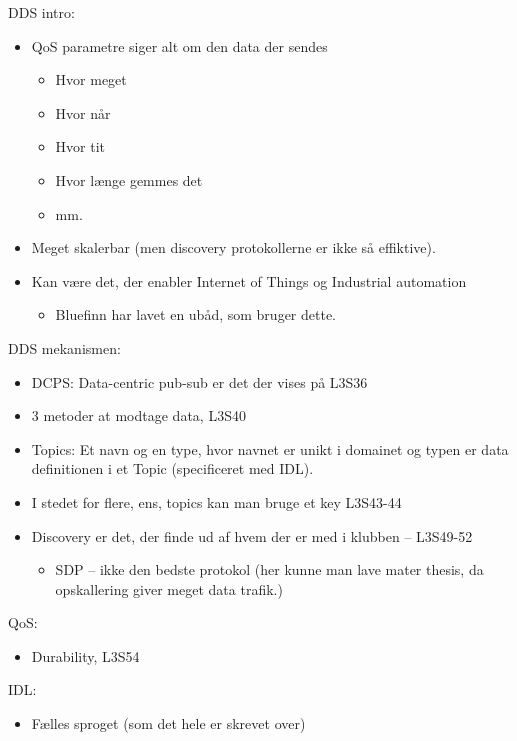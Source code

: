 \documentclass[oneside, 10pt]{article}
\begin{document}
DDS intro:
\begin{itemize}
	\item QoS parametre siger alt om den data der sendes
	\begin{itemize}
	 	\item Hvor meget
	 	\item Hvor når
	 	\item Hvor tit
	 	\item Hvor længe gemmes det
	 	\item mm.
	 \end{itemize} 

	 \item Meget skalerbar (men discovery protokollerne er ikke så effiktive).
	 \item Kan være det, der enabler Internet of Things og Industrial automation
	 \begin{itemize}
	 	\item Bluefinn har lavet en ubåd, som bruger dette.
	 \end{itemize}
\end{itemize}

DDS mekanismen:
\begin{itemize}
	\item DCPS: Data-centric pub-sub er det der vises på L3S36
	\item 3 metoder at modtage data, L3S40
	\item Topics: Et navn og en type, hvor navnet er unikt i domainet og typen er data definitionen i et Topic (specificeret med IDL).
	\item I stedet for flere, ens, topics kan man bruge et key L3S43-44
	\item Discovery er det, der finde ud af hvem der er med i klubben -- L3S49-52
	\begin{itemize}
		\item SDP -- ikke den bedste protokol (her kunne man lave mater thesis, da opskallering giver meget data trafik.)
	\end{itemize}
\end{itemize}

QoS:
\begin{itemize}
	\item Durability, L3S54
\end{itemize}

IDL:
\begin{itemize}
	\item Fælles sproget (som det hele er skrevet over)
\end{itemize}
\end{document}
